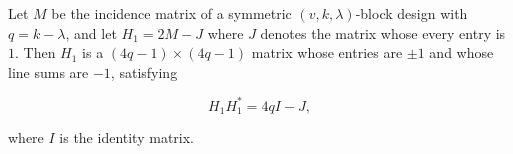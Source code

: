 Let $M$ be the incidence matrix of a symmetric $(v,k,\lambda)$-block design with $q = k - \lambda$, and let $H_1 = 2M - J$ where $J$ denotes the matrix whose every entry is $1$. Then $H_1$ is a $(4q - 1) \times (4q - 1)$ matrix whose entries are $\pm 1$ and whose line sums are $-1$, satisfying

$$H_1 H_1^* = 4qI - J,$$

where $I$ is the identity matrix.
